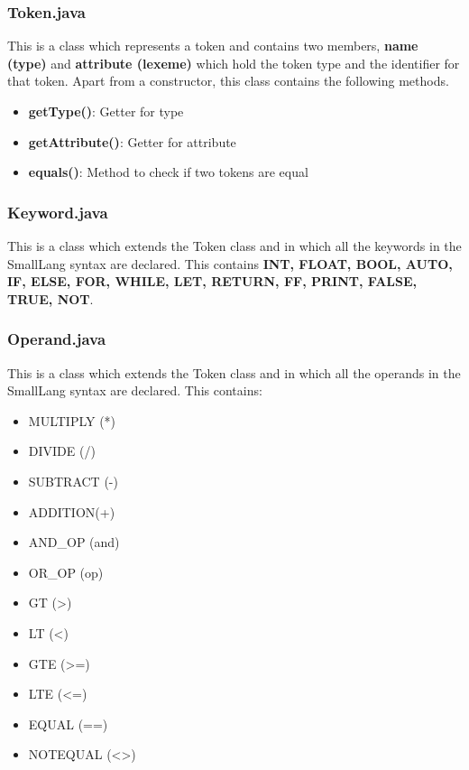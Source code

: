 \documentclass{article}
\begin{document}
					\subsubsection{Token.java}
					
					This is a class which represents a token and contains two members, \textbf{name (type)} and \textbf{attribute (lexeme)} which hold the token type and the identifier for that token. Apart from a constructor, this class contains the following methods.
					\begin{itemize}
						\item \textbf{getType()}: Getter for type
						\item \textbf{getAttribute()}: Getter for attribute
						\item \textbf{equals()}: Method to check if two tokens are equal
					\end{itemize}		
					
					\subsubsection{Keyword.java}
					
					This is a class which extends the Token class and in which all the keywords in the SmallLang syntax are declared. This contains \textbf{INT, FLOAT, BOOL, AUTO, IF, ELSE, FOR, WHILE, LET, RETURN, FF, PRINT, FALSE, TRUE, NOT}.	
				
					\subsubsection{Operand.java}
					
					This is a class which extends the Token class and in which all the operands in the SmallLang syntax are declared. This contains: 
					
					
					\begin{itemize}
						\item MULTIPLY (*)
						\item  DIVIDE (/)
						\item  SUBTRACT (-)
			    			\item ADDITION(+)
			    			\item AND\_OP (and)
			    			\item OR\_OP (op)
			    			\item GT (\textgreater)
						\item  LT (\textless)
			    			\item GTE (\textgreater=)
						\item  LTE (\textless=)
			    			\item  EQUAL (==)
						\item NOTEQUAL (\textless\textgreater)
					\end{itemize}
					
\end{document}
